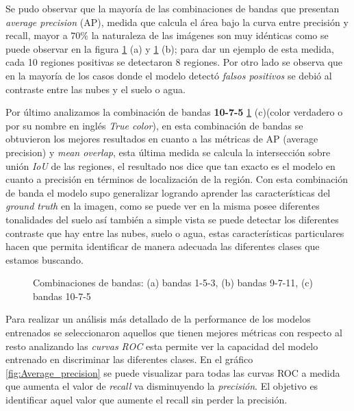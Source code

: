 Se pudo observar que la mayoría de las combinaciones de bandas que presentan \textit{average precision} (AP), medida que calcula  el área bajo la curva entre precisión y recall, mayor a $70\%$ la naturaleza de las imágenes son muy idénticas como se puede observar en la figura \ref{fig:COMB_BANDAS} (a) y \ref{fig:COMB_BANDAS} (b); para dar un ejemplo de esta medida, cada 10 regiones positivas se detectaron $8$ regiones. Por otro lado se observa que en la mayoría de los casos donde el modelo detectó \textit{falsos positivos} se debió al contraste entre las nubes y el suelo o agua.



Por último analizamos la combinación de bandas \textbf{10-7-5} \ref{fig:COMB_BANDAS} (c)(color verdadero o por su nombre en inglés \textit{True color}), en esta combinación de bandas se obtuvieron los mejores resultados en cuanto a las métricas de AP (average precision) y  \textit{mean overlap}, esta última medida se calcula la intersección sobre unión \textit{IoU} de las regiones, el resultado nos dice que tan exacto es el modelo en cuanto a precisión en términos de localización de la región. Con esta combinación de banda el modelo supo generalizar logrando aprender las características del \textit{ground truth} en la imagen, como se puede ver en la misma posee diferentes tonalidades del suelo así también a simple vista se puede detectar los diferentes contraste que hay entre las nubes, suelo o agua, estas características particulares hacen que permita identificar de manera adecuada las diferentes clases que estamos buscando.

\begin{figure}[htbp]
\centering
{}
\caption{Combinaciones de bandas: (a) bandas 1-5-3, (b) bandas 9-7-11, (c) bandas 10-7-5} \label{fig:COMB_BANDAS}
\end{figure}

Para realizar un análisis más detallado de la performance de los modelos entrenados se seleccionaron aquellos que tienen mejores métricas con respecto al resto analizando las \textit{curvas ROC} esta permite ver la capacidad del modelo entrenado en discriminar las diferentes clases. En el gráfico \ref{fig:Average_precision} se puede visualizar para todas las curvas ROC a medida que aumenta el valor de \textit{recall} va disminuyendo la \textit{precisión}. El objetivo es identificar aquel valor que aumente el recall sin perder la precisión.
\newpage

